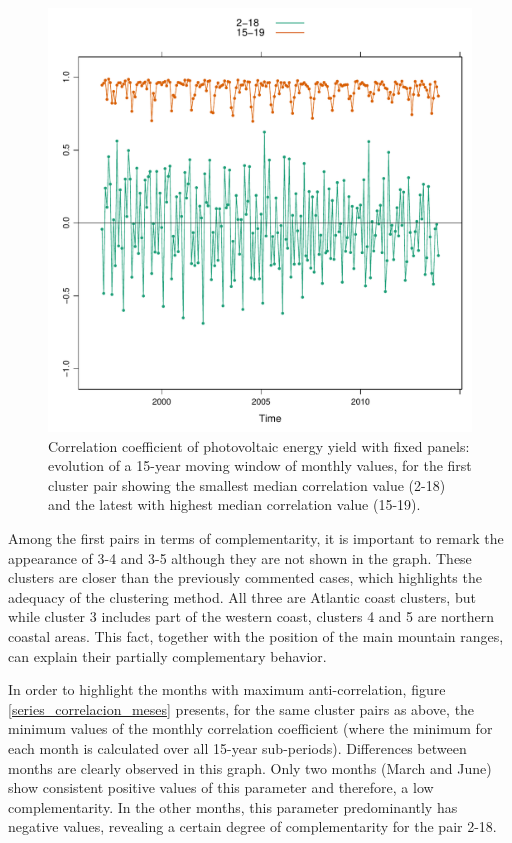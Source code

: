 \begin{figure}[h!]
\includegraphics[scale=0.6]{figs/capitulo5/figure8.pdf}
\caption{Correlation coefficient of photovoltaic energy yield with fixed panels: evolution of a 15-year moving window of monthly values, for the first cluster pair showing the smallest median correlation value (2-18) and the latest with highest median correlation value (15-19).}
\label{series_correlacion}
\end{figure}

Among the first pairs in terms of complementarity, it is important to remark the appearance of 3-4 and 3-5 although they are not shown in the graph. These clusters are closer than the previously commented cases, which highlights the adequacy of the clustering method. All three are Atlantic coast clusters, but while cluster 3 includes part of the western coast, clusters 4 and 5 are northern coastal areas. This fact, together with the position of the main mountain ranges, can explain their partially complementary behavior.

In order to highlight the months with maximum anti-correlation, figure \ref{series_correlacion_meses} presents, for the same cluster pairs as above, the minimum values of the monthly correlation coefficient (where the minimum for each month is calculated over all 15-year sub-periods). Differences between months are clearly observed in this graph. Only two months (March and June) show consistent positive values of this parameter and therefore, a low complementarity. In the other months, this parameter predominantly has negative values, revealing a certain degree of complementarity for the pair 2-18.


